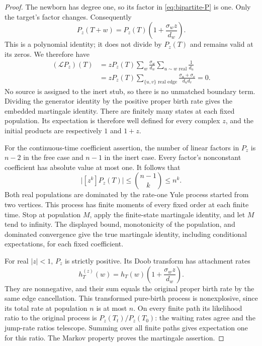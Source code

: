 \begin{proof}
The newborn has degree one, so its factor in \eqref{eq:bipartite-P} is
one.  Only the target's factor changes.  Consequently
\begin{equation}
 P_z(T+w)=P_z(T)\left(1+\frac{\sigma_wz}{d_w}\right).
 \label{eq:bipartite-birth-ratio}
\end{equation}
This is a polynomial identity; it does not divide by $P_z(T)$ and remains
valid at its zeros.  We therefore have
\begin{align*}
 (\mathcal LP_z)(T)
 &=zP_z(T)\sum_w\frac{\sigma_w}{d_w}
                 \sum_{u\sim w\text{ real}}\frac1{d_u}\\
 &=zP_z(T)\sum_{\{u,v\}\text{ real edge}}
                  \frac{\sigma_u+\sigma_v}{d_ud_v}=0.
\end{align*}
No source is assigned to the inert stub, so there is no unmatched
boundary term.  Dividing the generator identity by the positive proper
birth rate gives the embedded martingale identity.  There are finitely
many states at each fixed population.  Its expectation is therefore
well defined for every complex $z$, and the initial products are
respectively $1$ and $1+z$.

For the continuous-time coefficient assertion, the number of linear
factors in $P_z$ is $n-2$ in the free case and $n-1$ in the inert case.
Every factor's nonconstant coefficient has absolute value at most one.
It follows that
\[
 \bigl|[z^k]P_z(T)\bigr|\le {n-1\choose k}\le n^k.
\]
Both real populations are dominated by the rate-one Yule process
started from two vertices.  This process has finite moments of every
fixed order at each finite time.  Stop at population $M$, apply the
finite-state martingale identity, and let $M$ tend to infinity.
The displayed bound, monotonicity of the population, and dominated
convergence give the true martingale identity, including conditional
expectations, for each fixed coefficient.

For real $|z|<1$, $P_z$ is strictly positive.  Its Doob transform has
attachment rates
\begin{equation}
 h_T^{(z)}(w)
    =h_T(w)\left(1+\frac{\sigma_wz}{d_w}\right).
 \label{eq:bipartite-doob-rates}
\end{equation}
They are nonnegative, and their sum equals the original proper birth
rate by the same edge cancellation.  This transformed pure-birth
process is nonexplosive, since its total rate at population $n$ is at
most $n$.  On every finite path its likelihood ratio to the original
process is $P_z(T_t)/P_z(T_0)$: the waiting rates agree and the jump-rate
ratios telescope.  Summing over all finite paths gives expectation one
for this ratio.  The Markov property proves the martingale assertion.


\end{proof}
